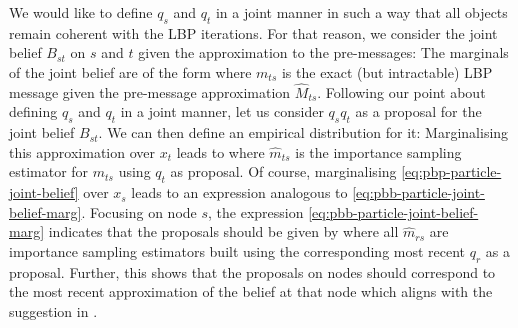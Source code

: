We would like to define $q_{s}$ and $q_{t}$ in a joint manner in such a way that all objects remain coherent with the LBP iterations. 
For that reason, we consider the joint belief $ B_{st}$ on $s$ and $t$ given the approximation to the pre-messages:
%
%
The marginals of the joint belief are of the form
%
%
where $m_{ts}$ is the exact (but intractable) LBP message given the pre-message approximation $\widehat M_{ts}$.
Following our point about defining $q_{s}$ and $q_{t}$ in a joint manner, let us consider $q_{s}q_{t}$ as a proposal for the joint belief $ B_{st}$.
We can then define an empirical distribution for it:
%
%
Marginalising this approximation over $x_{t}$ leads to
%
%
where $\widehat{m}_{ts}$ is the importance sampling estimator for $ m_{ts}$ using $q_{t}$ as proposal. Of course, marginalising \eqref{eq:pbp-particle-joint-belief} over $x_{s}$ leads to an expression analogous to \eqref{eq:pbb-particle-joint-belief-marg}. Focusing on node $s$, the expression \eqref{eq:pbb-particle-joint-belief-marg} indicates that the proposals should be given by
%
where all $\widehat m_{rs}$ are importance sampling estimators built using the corresponding most recent $q_{r}$ as a proposal. Further, this shows that the proposals on nodes should correspond to the most recent approximation of the belief at that node which aligns with the suggestion in \citet{ihler09}.

